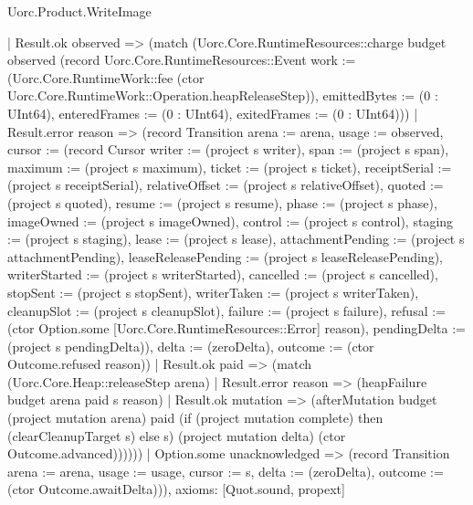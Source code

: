\begin{lexlean}{Uorc.Product.WriteImage}
\begin{semanticmodule}
{        | Result.ok observed => (match (Uorc.Core.RuntimeResources::charge budget observed (record Uorc.Core.RuntimeResources::Event {work := (Uorc.Core.RuntimeWork::fee (ctor Uorc.Core.RuntimeWork::Operation.heapReleaseStep)), emittedBytes := (0 : UInt64), enteredFrames := (0 : UInt64), exitedFrames := (0 : UInt64)}))
          | Result.error reason => (record Transition {arena := arena, usage := observed, cursor := (record Cursor {writer := (project s writer), span := (project s span), maximum := (project s maximum), ticket := (project s ticket), receiptSerial := (project s receiptSerial), relativeOffset := (project s relativeOffset), quoted := (project s quoted), resume := (project s resume), phase := (project s phase), imageOwned := (project s imageOwned), control := (project s control), staging := (project s staging), lease := (project s lease), attachmentPending := (project s attachmentPending), leaseReleasePending := (project s leaseReleasePending), writerStarted := (project s writerStarted), cancelled := (project s cancelled), stopSent := (project s stopSent), writerTaken := (project s writerTaken), cleanupSlot := (project s cleanupSlot), failure := (project s failure), refusal := (ctor Option.some [Uorc.Core.RuntimeResources::Error] reason), pendingDelta := (project s pendingDelta)}), delta := (zeroDelta), outcome := (ctor Outcome.refused reason)})
          | Result.ok paid => (match (Uorc.Core.Heap::releaseStep arena)
            | Result.error reason => (heapFailure budget arena paid s reason)
            | Result.ok mutation => (afterMutation budget (project mutation arena) paid (if (project mutation complete) then (clearCleanupTarget s) else s) (project mutation delta) (ctor Outcome.advanced))))))
    | Option.some unacknowledged => (record Transition {arena := arena, usage := usage, cursor := s, delta := (zeroDelta), outcome := (ctor Outcome.awaitDelta)})),
  axioms: [Quot.sound, propext]
}


\end{semanticmodule}
\end{lexlean}
